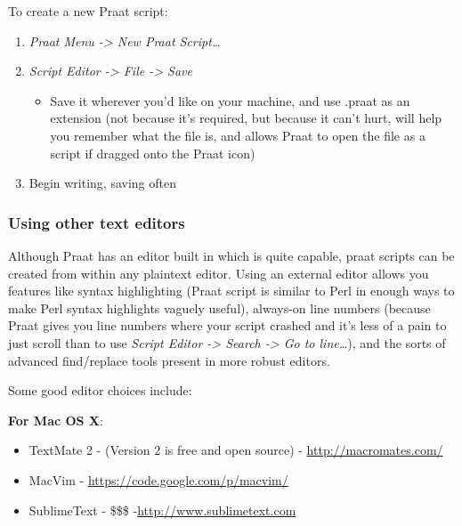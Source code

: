 \documentclass[11pt]{article}
\def\tightlist{}
\begin{document}
To create a new Praat script:

\begin{enumerate}
\def\labelenumi{\arabic{enumi}.}
\tightlist
\item
  \emph{Praat Menu -\textgreater{} New Praat Script\ldots{}}
\item
  \emph{Script Editor -\textgreater{} File -\textgreater{} Save}

  \begin{itemize}
  \tightlist
  \item
    Save it wherever you'd like on your machine, and use .praat as an
    extension (not because it's required, but because it can't hurt,
    will help you remember what the file is, and allows Praat to open
    the file as a script if dragged onto the Praat icon)
  \end{itemize}
\item
  Begin writing, saving often
\end{enumerate}

\hypertarget{using-other-text-editors}{%
\subsubsection{Using other text
editors}\label{using-other-text-editors}}

Although Praat has an editor built in which is quite capable, praat
scripts can be created from within any plaintext editor. Using an
external editor allows you features like syntax highlighting (Praat
script is similar to Perl in enough ways to make Perl syntax highlights
vaguely useful), always-on line numbers (because Praat gives you line
numbers where your script crashed and it's less of a pain to just scroll
than to use \emph{Script Editor -\textgreater{} Search -\textgreater{}
Go to line\ldots{}}), and the sorts of advanced find/replace tools
present in more robust editors.

Some good editor choices include:

\textbf{For Mac OS X}:

\begin{itemize}
\tightlist
\item
  TextMate 2 - (Version 2 is free and open source) -
  \url{http://macromates.com/}
\item
  MacVim - \url{https://code.google.com/p/macvim/}
\item
  SublimeText - \$\$\$ -\url{http://www.sublimetext.com}
\end{itemize}
\end{document}
